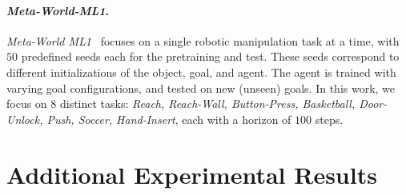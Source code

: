 \documentclass{article}
\begin{document}
\paragraph{\textit{Meta-World-ML1}.}
\textit{Meta-World ML1}~\cite{yu2020meta} focuses on a single robotic manipulation task at a time, with $50$ predefined seeds each for the pretraining and test. These seeds correspond to different initializations of the object, goal, and agent. The agent is trained with varying goal configurations, and tested on new (unseen) goals.
In this work, we focus on $8$ distinct tasks: \textit{Reach, Reach-Wall, Button-Press, Basketball, Door-Unlock, Push, Soccer, Hand-Insert}, each with a horizon of $100$ steps.
\section{Additional Experimental Results}
\end{document}
